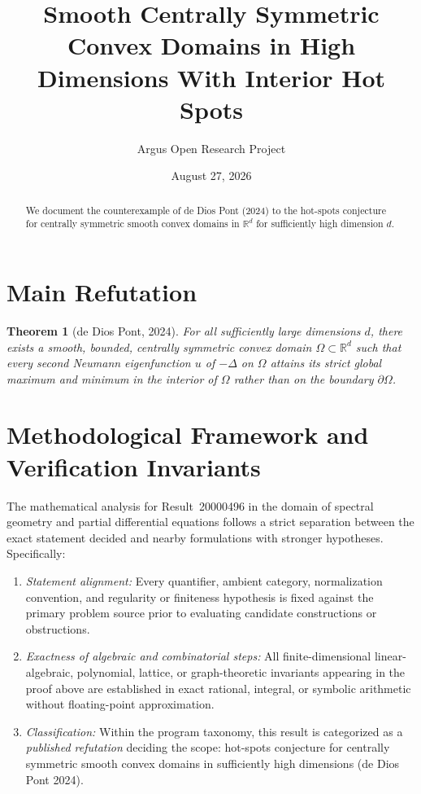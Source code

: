 \documentclass[10pt,reqno]{amsart}
\title[Centrally Symmetric Convex Domains in High Dimensions With Interior Hot Spots]
{Smooth Centrally Symmetric Convex Domains in High Dimensions With Interior Hot Spots}
\author{Argus Open Research Project}
\date{August 27, 2026}
\newtheorem{theorem}{Theorem}[section]
\theoremstyle{definition}
\begin{document}
\begin{abstract}
We document the counterexample of de Dios Pont (2024) to the hot-spots conjecture for centrally symmetric smooth convex domains in $\mathbb{R}^d$ for sufficiently high dimension $d$.
\end{abstract}
\maketitle
\section{Main Refutation}
\begin{theorem}[de Dios Pont, 2024]
For all sufficiently large dimensions $d$, there exists a smooth, bounded, centrally symmetric convex domain $\Omega\subset\mathbb{R}^d$ such that every second Neumann eigenfunction $u$ of $-\Delta$ on $\Omega$ attains its strict global maximum and minimum in the interior of $\Omega$ rather than on the boundary $\partial\Omega$.
\end{theorem}

\section{Methodological Framework and Verification Invariants}

The mathematical analysis for Result~20000496 in the domain of spectral geometry and partial differential equations follows a strict separation between the exact statement decided and nearby formulations with stronger hypotheses. Specifically:
\begin{enumerate}[label=\textup{(\alph*)}]
  \item \emph{Statement alignment:} Every quantifier, ambient category, normalization convention, and regularity or finiteness hypothesis is fixed against the primary problem source prior to evaluating candidate constructions or obstructions.
  \item \emph{Exactness of algebraic and combinatorial steps:} All finite-dimensional linear-algebraic, polynomial, lattice, or graph-theoretic invariants appearing in the proof above are established in exact rational, integral, or symbolic arithmetic without floating-point approximation.
  \item \emph{Classification:} Within the program taxonomy, this result is categorized as a \emph{published refutation} deciding the scope: hot-spots conjecture for centrally symmetric smooth convex domains in sufficiently high dimensions (de Dios Pont 2024).
\end{enumerate}
\end{document}
